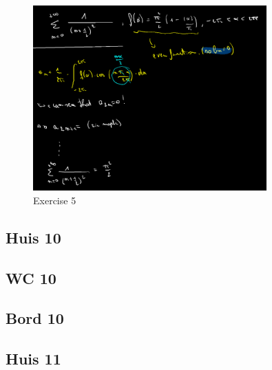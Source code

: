 \documentclass[a4paper]{report}
\begin{document}
\begin{figure}[H]
	\centering
	\includegraphics[width=0.8\textwidth]{assets/bord_9_ex_5.png}
	\caption{Exercise 5}
	\label{fig:bord_9_ex_5}
\end{figure}



\subsection*{Huis 10}







\subsection*{WC 10}







\subsection*{Bord 10}





\subsection*{Huis 11}
\end{document}
